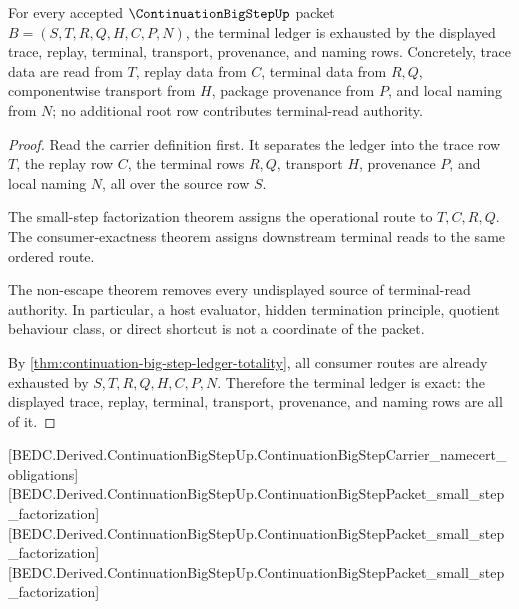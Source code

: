 \begin{theorem}
\label{thm:continuation-bigstep-root-terminal-ledger-exactness}
For every accepted $\ContinuationBigStepUp$ packet $B=(S,T,R,Q,H,C,P,N)$, the terminal ledger is exhausted by the displayed trace, replay, terminal, transport, provenance, and naming rows. Concretely, trace data are read from $T$, replay data from $C$, terminal data from $R,Q$, componentwise transport from $H$, package provenance from $P$, and local naming from $N$; no additional root row contributes terminal-read authority.
\end{theorem}
\begin{proof}
Read the carrier definition first. It separates the ledger into the trace row $T$, the replay row $C$, the terminal rows $R,Q$, transport $H$, provenance $P$, and local naming $N$, all over the source row $S$.

The small-step factorization theorem assigns the operational route to $T,C,R,Q$. The consumer-exactness theorem assigns downstream terminal reads to the same ordered route.

The non-escape theorem removes every undisplayed source of terminal-read authority. In particular, a host evaluator, hidden termination principle, quotient behaviour class, or direct shortcut is not a coordinate of the packet.

By \autoref{thm:continuation-big-step-ledger-totality}, all consumer routes are already exhausted by $S,T,R,Q,H,C,P,N$. Therefore the terminal ledger is exact: the displayed trace, replay, terminal, transport, provenance, and naming rows are all of it.
\end{proof}

[BEDC.Derived.ContinuationBigStepUp.ContinuationBigStepCarrier\_namecert\_obligations]
[BEDC.Derived.ContinuationBigStepUp.ContinuationBigStepPacket\_small\_step\_factorization]
[BEDC.Derived.ContinuationBigStepUp.ContinuationBigStepPacket\_small\_step\_factorization]
[BEDC.Derived.ContinuationBigStepUp.ContinuationBigStepPacket\_small\_step\_factorization]

